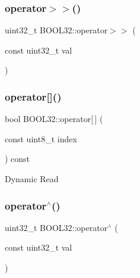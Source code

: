 \hypertarget{struct_b_o_o_l32_ae8b32e977d86d7062cb74b7899fa2091}{}\label{struct_b_o_o_l32_ae8b32e977d86d7062cb74b7899fa2091} 
\subsubsection{\texorpdfstring{operator$>$$>$()}{operator>>()}}
{\footnotesize\ttfamily uint32\+\_\+t B\+O\+O\+L32\+::operator$>$$>$ (\begin{DoxyParamCaption}\item[{const uint32\+\_\+t}]{val }\end{DoxyParamCaption})\hspace{0.3cm}{\ttfamily [inline]}}

\hypertarget{struct_b_o_o_l32_aa3890549e1c6f9b8e4ef5d7a55188e75}{}\label{struct_b_o_o_l32_aa3890549e1c6f9b8e4ef5d7a55188e75} 
\subsubsection{\texorpdfstring{operator[]()}{operator[]()}}
{\footnotesize\ttfamily bool B\+O\+O\+L32\+::operator\mbox{[}$\,$\mbox{]} (\begin{DoxyParamCaption}\item[{const uint8\+\_\+t}]{index }\end{DoxyParamCaption}) const\hspace{0.3cm}{\ttfamily [inline]}}

Dynamic Read \hypertarget{struct_b_o_o_l32_a74841bcb1bc7a60dd6326069548baa0f}{}\label{struct_b_o_o_l32_a74841bcb1bc7a60dd6326069548baa0f} 
\subsubsection{\texorpdfstring{operator$^\wedge$()}{operator^()}\hspace{0.1cm}{\footnotesize\ttfamily [1/2]}}
{\footnotesize\ttfamily uint32\+\_\+t B\+O\+O\+L32\+::operator$^\wedge$ (\begin{DoxyParamCaption}\item[{const uint32\+\_\+t}]{val }\end{DoxyParamCaption})\hspace{0.3cm}{\ttfamily [inline]}}

